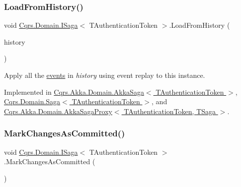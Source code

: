 \mbox{\label{interfaceCqrs_1_1Domain_1_1ISaga_a2714804684bc65cf4dec79b4697b9b21_a2714804684bc65cf4dec79b4697b9b21}} 
\subsubsection{\texorpdfstring{Load\+From\+History()}{LoadFromHistory()}}
{\footnotesize\ttfamily void \hyperlink{interfaceCqrs_1_1Domain_1_1ISaga}{Cqrs.\+Domain.\+I\+Saga}$<$ T\+Authentication\+Token $>$.Load\+From\+History (\begin{DoxyParamCaption}\item[{I\+Enumerable$<$ \hyperlink{interfaceCqrs_1_1Events_1_1ISagaEvent}{I\+Saga\+Event}$<$ T\+Authentication\+Token $>$$>$}]{history }\end{DoxyParamCaption})}



Apply all the \hyperlink{}{events} in {\itshape history}  using event replay to this instance. 



Implemented in \hyperlink{classCqrs_1_1Akka_1_1Domain_1_1AkkaSaga_a40b859bc15c2f7c87a21b07f9bc9548c_a40b859bc15c2f7c87a21b07f9bc9548c}{Cqrs.\+Akka.\+Domain.\+Akka\+Saga$<$ T\+Authentication\+Token $>$}, \hyperlink{classCqrs_1_1Domain_1_1Saga_a6029fc09445e2093f7fb40e304a04ff8_a6029fc09445e2093f7fb40e304a04ff8}{Cqrs.\+Domain.\+Saga$<$ T\+Authentication\+Token $>$}, and \hyperlink{classCqrs_1_1Akka_1_1Domain_1_1AkkaSagaProxy_a21b69799b046c1fcdf5b2443699dee0c_a21b69799b046c1fcdf5b2443699dee0c}{Cqrs.\+Akka.\+Domain.\+Akka\+Saga\+Proxy$<$ T\+Authentication\+Token, T\+Saga $>$}.

\mbox{\label{interfaceCqrs_1_1Domain_1_1ISaga_a85c75f80bc5be4bad7f1d9f1231bfba7_a85c75f80bc5be4bad7f1d9f1231bfba7}} 
\subsubsection{\texorpdfstring{Mark\+Changes\+As\+Committed()}{MarkChangesAsCommitted()}}
{\footnotesize\ttfamily void \hyperlink{interfaceCqrs_1_1Domain_1_1ISaga}{Cqrs.\+Domain.\+I\+Saga}$<$ T\+Authentication\+Token $>$.Mark\+Changes\+As\+Committed (\begin{DoxyParamCaption}{ }\end{DoxyParamCaption})}



